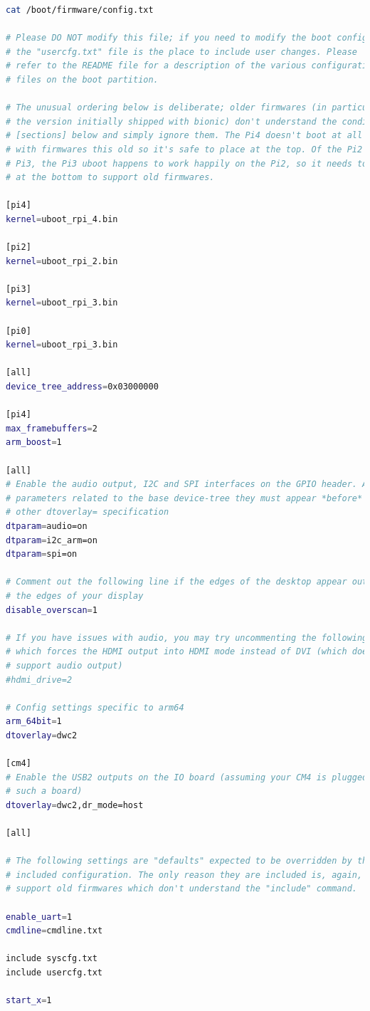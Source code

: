 \begin{lstlisting}[language=bash]
cat /boot/firmware/config.txt 

# Please DO NOT modify this file; if you need to modify the boot config,
# the "usercfg.txt" file is the place to include user changes. Please 
# refer to the README file for a description of the various configuration 
# files on the boot partition.

# The unusual ordering below is deliberate; older firmwares (in particular 
# the version initially shipped with bionic) don't understand the conditional
# [sections] below and simply ignore them. The Pi4 doesn't boot at all 
# with firmwares this old so it's safe to place at the top. Of the Pi2 and 
# Pi3, the Pi3 uboot happens to work happily on the Pi2, so it needs to go 
# at the bottom to support old firmwares.

[pi4]
kernel=uboot_rpi_4.bin

[pi2]
kernel=uboot_rpi_2.bin

[pi3]
kernel=uboot_rpi_3.bin

[pi0]
kernel=uboot_rpi_3.bin

[all]
device_tree_address=0x03000000

[pi4]
max_framebuffers=2
arm_boost=1

[all]
# Enable the audio output, I2C and SPI interfaces on the GPIO header. As these
# parameters related to the base device-tree they must appear *before* any
# other dtoverlay= specification
dtparam=audio=on
dtparam=i2c_arm=on
dtparam=spi=on

# Comment out the following line if the edges of the desktop appear outside
# the edges of your display
disable_overscan=1

# If you have issues with audio, you may try uncommenting the following line
# which forces the HDMI output into HDMI mode instead of DVI (which doesn't
# support audio output)
#hdmi_drive=2

# Config settings specific to arm64
arm_64bit=1
dtoverlay=dwc2

[cm4]
# Enable the USB2 outputs on the IO board (assuming your CM4 is plugged into
# such a board)
dtoverlay=dwc2,dr_mode=host

[all]

# The following settings are "defaults" expected to be overridden by the
# included configuration. The only reason they are included is, again, to
# support old firmwares which don't understand the "include" command.

enable_uart=1
cmdline=cmdline.txt

include syscfg.txt
include usercfg.txt

start_x=1
\end{lstlisting}

